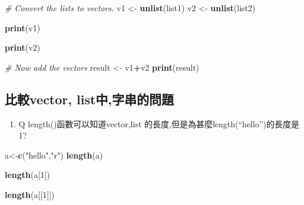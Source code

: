 \documentclass[]{book}
\newenvironment{Shaded}{\begin{snugshade}}{\end{snugshade}}
\newcommand{\KeywordTok}[1]{\textcolor[rgb]{0.13,0.29,0.53}{\textbf{#1}}}
\newcommand{\DecValTok}[1]{\textcolor[rgb]{0.00,0.00,0.81}{#1}}
\newcommand{\StringTok}[1]{\textcolor[rgb]{0.31,0.60,0.02}{#1}}
\newcommand{\CommentTok}[1]{\textcolor[rgb]{0.56,0.35,0.01}{\textit{#1}}}
\newcommand{\OperatorTok}[1]{\textcolor[rgb]{0.81,0.36,0.00}{\textbf{#1}}}
\newcommand{\NormalTok}[1]{#1}
\providecommand{\tightlist}{%
  \setlength{\itemsep}{0pt}\setlength{\parskip}{0pt}}
\theoremstyle{definition}
\theoremstyle{definition}
\theoremstyle{definition}
\theoremstyle{remark}
\begin{document}
\begin{Shaded}
\begin{Highlighting}[]
\CommentTok{# Convert the lists to vectors.}
\NormalTok{v1 <-}\StringTok{ }\KeywordTok{unlist}\NormalTok{(list1)}
\NormalTok{v2 <-}\StringTok{ }\KeywordTok{unlist}\NormalTok{(list2)}

\KeywordTok{print}\NormalTok{(v1)}
\end{Highlighting}
\end{Shaded}

\begin{Shaded}
\begin{Highlighting}[]
\KeywordTok{print}\NormalTok{(v2)}
\end{Highlighting}
\end{Shaded}

\begin{Shaded}
\begin{Highlighting}[]
\CommentTok{# Now add the vectors}
\NormalTok{result <-}\StringTok{ }\NormalTok{v1}\OperatorTok{+}\NormalTok{v2}
\KeywordTok{print}\NormalTok{(result)}
\end{Highlighting}
\end{Shaded}

\subsection{比較vector, list中,字串的問題}\label{vector-list}

\begin{enumerate}
\def\labelenumi{\arabic{enumi}.}
\tightlist
\item
  Q length()函數可以知道vector,list
  的長度,但是為甚麼length(``hello'')的長度是1?
\end{enumerate}

\begin{Shaded}
\begin{Highlighting}[]
\NormalTok{a<-}\KeywordTok{c}\NormalTok{(}\StringTok{"hello"}\NormalTok{,}\StringTok{"r"}\NormalTok{)}
\KeywordTok{length}\NormalTok{(a)}
\end{Highlighting}
\end{Shaded}

\begin{Shaded}
\begin{Highlighting}[]
\KeywordTok{length}\NormalTok{(a[}\DecValTok{1}\NormalTok{])}
\end{Highlighting}
\end{Shaded}

\begin{Shaded}
\begin{Highlighting}[]
\KeywordTok{length}\NormalTok{(a[[}\DecValTok{1}\NormalTok{]])}
\end{Highlighting}
\end{Shaded}
\end{document}
